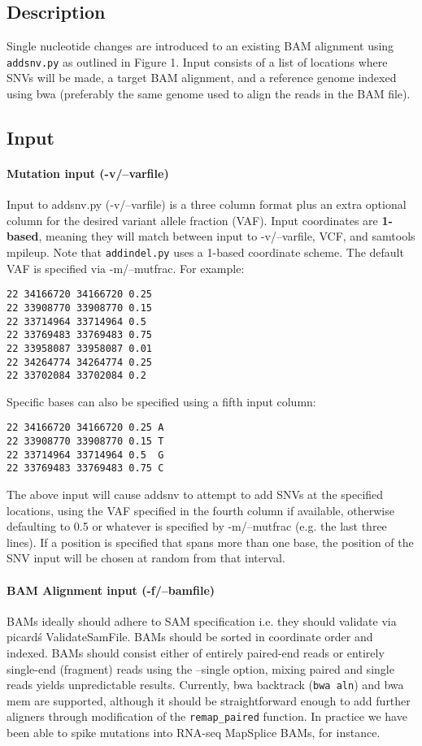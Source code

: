 \documentclass[letterpaper,11pt]{article}
\begin{document}
\subsection{Description}
    Single nucleotide changes are introduced to an existing BAM alignment using \texttt {addsnv.py} as outlined in Figure 1. Input consists of a list of locations where SNVs will be made, a target BAM alignment, and a reference genome indexed using bwa (preferably the same genome used to align the reads in the BAM file). 

\subsection{Input}
\paragraph{Mutation input (-v/--varfile)}
	Input to addsnv.py (-v/--varfile) is a three column format plus an extra optional column for the desired variant allele fraction (VAF). Input coordinates are \textbf{1-based}, meaning they will match between input to -v/--varfile, VCF, and samtools mpileup. Note that \texttt{addindel.py} uses a 1-based coordinate scheme. The default VAF is specified via -m/--mutfrac. For example:
\begin{verbatim}
22 34166720 34166720 0.25
22 33908770 33908770 0.15
22 33714964 33714964 0.5
22 33769483 33769483 0.75
22 33958087 33958087 0.01
22 34264774 34264774 0.25
22 33702084 33702084 0.2
\end{verbatim}

Specific bases can also be specified using a fifth input column:
\begin{verbatim}
22 34166720 34166720 0.25 A
22 33908770 33908770 0.15 T
22 33714964 33714964 0.5  G
22 33769483 33769483 0.75 C
\end{verbatim}

    The above input will cause addsnv to attempt to add SNVs at the specified locations, using the VAF specified in the fourth column if available, otherwise defaulting to 0.5 or whatever is specified by -m/--mutfrac (e.g. the last three lines). If a position is specified that spans more than one base, the position of the SNV input will be chosen at random from that interval.

\paragraph{BAM Alignment input (-f/--bamfile)}
	BAMs ideally should adhere to SAM specification i.e. they should validate via picard\'s ValidateSamFile. BAMs should be sorted in coordinate order and indexed. BAMs should consist either of entirely paired-end reads or entirely single-end (fragment) reads using the --single option, mixing paired and single reads yields unpredictable results. Currently, bwa backtrack (\texttt{bwa aln}) and bwa mem are supported, although it should be straightforward enough to add further aligners through modification of the \texttt{remap\_paired} function. In practice we have been able to spike mutations into RNA-seq MapSplice BAMs, for instance.
\end{document}
